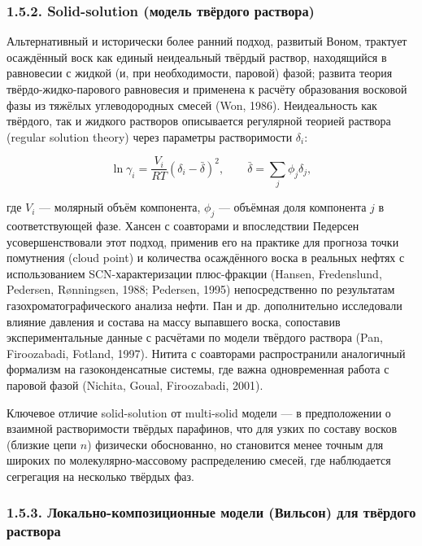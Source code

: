 \documentclass[11pt]{extarticle}
\begin{document}
\subsubsection{1.5.2. Solid-solution (модель твёрдого раствора)}\label{solid-solution-ux43cux43eux434ux435ux43bux44c-ux442ux432ux451ux440ux434ux43eux433ux43e-ux440ux430ux441ux442ux432ux43eux440ux430}

Альтернативный и исторически более ранний подход, развитый Воном, трактует осаждённый воск как единый неидеальный твёрдый раствор, находящийся в равновесии с жидкой (и, при необходимости, паровой) фазой; развита теория твёрдо-жидко-парового равновесия и применена к расчёту образования восковой фазы из тяжёлых углеводородных смесей (Won, 1986). Неидеальность как твёрдого, так и жидкого растворов описывается регулярной теорией раствора (regular solution theory) через параметры растворимости \(\delta_i\):

\[
\ln \gamma_i = \frac{V_i}{RT}\left(\delta_i - \bar\delta\right)^2, \qquad \bar\delta = \sum_j \phi_j \delta_j,
\]

где \(V_i\) --- молярный объём компонента, \(\phi_j\) --- объёмная доля компонента \(j\) в соответствующей фазе. Хансен с соавторами и впоследствии Педерсен усовершенствовали этот подход, применив его на практике для прогноза точки помутнения (cloud point) и количества осаждённого воска в реальных нефтях с использованием SCN-характеризации плюс-фракции (Hansen, Fredenslund, Pedersen, Rønningsen, 1988; Pedersen, 1995) непосредственно по результатам газохроматографического анализа нефти. Пан и др. дополнительно исследовали влияние давления и состава на массу выпавшего воска, сопоставив экспериментальные данные с расчётами по модели твёрдого раствора (Pan, Firoozabadi, Fotland, 1997). Нитита с соавторами распространили аналогичный формализм на газоконденсатные системы, где важна одновременная работа с паровой фазой (Nichita, Goual, Firoozabadi, 2001).

Ключевое отличие solid-solution от multi-solid модели --- в предположении о взаимной растворимости твёрдых парафинов, что для узких по составу восков (близкие цепи \(n\)) физически обоснованно, но становится менее точным для широких по молекулярно-массовому распределению смесей, где наблюдается сегрегация на несколько твёрдых фаз.

\subsubsection{1.5.3. Локально-композиционные модели (Вильсон) для твёрдого раствора}\label{ux43bux43eux43aux430ux43bux44cux43dux43e-ux43aux43eux43cux43fux43eux437ux438ux446ux438ux43eux43dux43dux44bux435-ux43cux43eux434ux435ux43bux438-ux432ux438ux43bux44cux441ux43eux43d-ux434ux43bux44f-ux442ux432ux451ux440ux434ux43eux433ux43e-ux440ux430ux441ux442ux432ux43eux440ux430}
\end{document}
